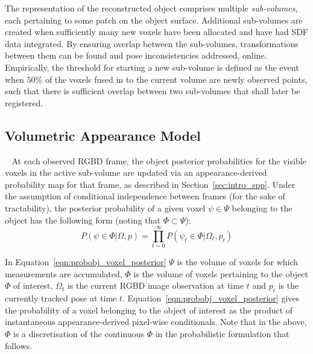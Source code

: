 The representation of the reconstructed object comprises multiple \textit{sub-volumes}, 
each pertaining to some patch on the object surface. Additional sub-volumes are created 
when sufficiently many new voxels have been allocated and have had SDF data integrated. 
By ensuring overlap between the sub-volumes, transformations between them can be found and 
pose inconsistencies addressed, online. Empirically, the threshold for starting a new
sub-volume is defined as the event when \( 50\% \) of the voxels fused in to the
current volume are newly observed points, such that there is sufficient overlap 
between two sub-volumes that shall later be registered.

\subsection{Volumetric Appearance Model}
~\label{subsec:probobj_vol_appearance_model}
At each observed RGBD frame, the object posterior probabilities for the visible
voxels in the active sub-volume are updated via an appearance-derived probability
map for that frame, as described in Section~\ref{sec:intro_spp}. Under the assumption 
of conditional independence between frames (for the sake of tractability), the posterior 
probability of a given voxel \( \psi \in \Psi \) belonging to the object has the following 
form (noting that \( \Phi \subset \Psi \)):
\begin{equation}
\label{eqn:probobj_voxel_posterior}
P(\psi \in \Phi | \Omega, p) = \prod_{t=0}^{\infty}
P(\psi_{t} \in \Phi | \Omega_{t}, p_{t})
\end{equation}

In Equation~\ref{eqn:probobj_voxel_posterior} \( \Psi \) is the volume of 
voxels for which measurements are accumulated, \( \Phi \)  is the volume of voxels 
pertaining to the object \( \Phi \) of interest, \(\Omega_{t}\) is the current 
RGBD image observation at time \(t\) and \(p_{t}\) is the currently tracked pose at 
time \(t\). Equation~\ref{eqn:probobj_voxel_posterior} gives the probability of 
a voxel belonging to the object of interest as the product of instantaneous appearance-derived 
pixel-wise conditionals. Note that in the above, \( \Phi \) is a discretisation of 
the continuous \( \Phi \) in the probabilistic formulation that follows.

